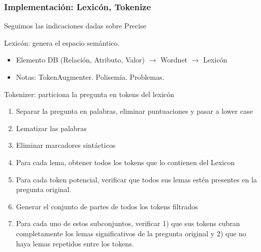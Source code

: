 \fontsize{9.5pt}{7.2}\selectfont
\begin{frame}[<+->]
\frametitle{Implementación: Lexicón, Tokenize}
  Seguimos las indicaciones dadas sobre Precise

  \begin{block}{Lexicón: genera el espacio semántico.}
    \begin{itemize}
      \item \fontsize{7.5pt}{7.2}\selectfont Elemento DB (Relación, Atributo, Valor) $\rightarrow$ Wordnet $\rightarrow$ Lexicón
      \item \fontsize{7.5pt}{7.2}\selectfont Notas: TokenAugmenter. Polisemia. Problemas.
    \end{itemize}
  \end{block}
  \begin{block}{Tokenizer: particiona la pregunta en tokens del lexicón}
      \begin{enumerate}
        \item \fontsize{7.5pt}{7.2}\selectfont Separar la pregunta en palabras, eliminar puntuaciones y pasar a lower case
        \item \fontsize{7.5pt}{7.2}\selectfont Lematizar las palabras
        \item \fontsize{7.5pt}{7.2}\selectfont Eliminar marcadores sintácticos
        \item \fontsize{7.5pt}{7.2}\selectfont Para cada lema, obtener todos los tokens que lo contienen del Lexicon
        \item \fontsize{7.5pt}{7.2}\selectfont Para cada token potencial, verificar que todos sus lemas estén presentes en la pregunta original.
        \item \fontsize{7.5pt}{7.2}\selectfont Generar el conjunto de partes de todos los tokens filtrados
        \item \fontsize{7.5pt}{7.2}\selectfont Para cada uno de estos subconjuntos, verificar 1) que sus tokens cubran completamente los lemas significativos de la pregunta original y 2) que no haya lemas repetidos entre los tokens.
        \end{enumerate}
  \end{block}
\end{frame}

